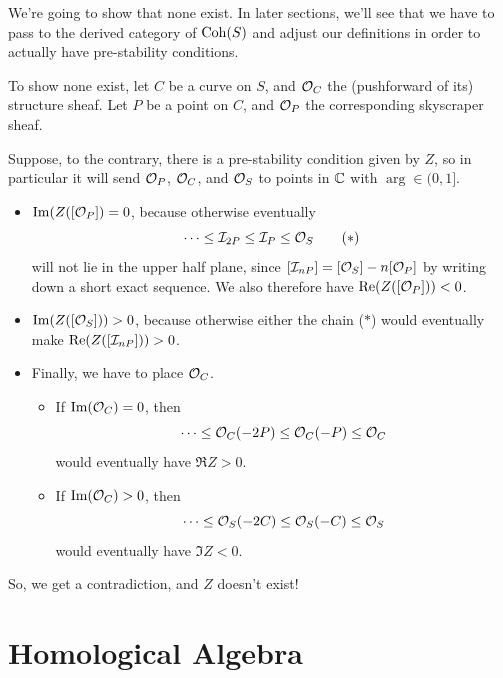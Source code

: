 \documentclass[12pt]{article}
\begin{document}
We're going to show that none exist. In later sections, we'll see that we have to pass to the derived category of $\operatorname{Coh}(S)$ and adjust our definitions in order to actually have pre-stability conditions.

To show none exist, let $C$ be a curve on $S$, and $\mathcal{O}_C$ the (pushforward of its) structure sheaf. Let $P$ be a point on $C$, and $\mathcal{O}_P$ the corresponding skyscraper sheaf.

Suppose, to the contrary, there is a pre-stability condition given by $Z$, so in particular it will send $\mathcal{O}_P$, $\mathcal{O}_C$, and $\mathcal{O}_S$ to points in $\mathbb{C}$ with $\arg \in (0,1]$.

\begin{itemize}
    \item $\operatorname{Im}(Z([\mathcal{O}_P])=0$, because otherwise eventually
    \[\cdots \leq \mathcal{I}_{2P} \leq \mathcal{I}_P \leq \mathcal{O}_S \tag{$*$}\]
    will not lie in the upper half plane, since $[\mathcal{I}_{nP}] = [\mathcal{O}_S]-n[\mathcal{O}_P]$ by writing down a short exact sequence. We also therefore have $\operatorname{Re}(Z([\mathcal{O}_P]))<0$.
    \item $\operatorname{Im}(Z([\mathcal{O}_S]))>0$, because otherwise either the chain ($*$) would eventually make $\operatorname{Re}(Z([\mathcal{I}_{nP}]))>0$.
    \item Finally, we have to place $\mathcal{O}_C$.
    \begin{itemize}
        \item If $\operatorname{Im}(\mathcal{O}_C)=0$, then 
        \[\cdots \leq \mathcal{O}_C(-2P) \leq \mathcal{O}_C(-P) \leq \mathcal{O}_C\]
        would eventually have $\Re Z > 0$.
        \item If $\operatorname{Im}(\mathcal{O}_C)>0$, then
        \[\cdots \leq \mathcal{O}_S(-2C) \leq \mathcal{O}_S(-C) \leq \mathcal{O}_S\]
        would eventually have $\Im Z < 0$.
    \end{itemize}
\end{itemize}

So, we get a contradiction, and $Z$ doesn't exist!


\section{Homological Algebra}
\end{document}
